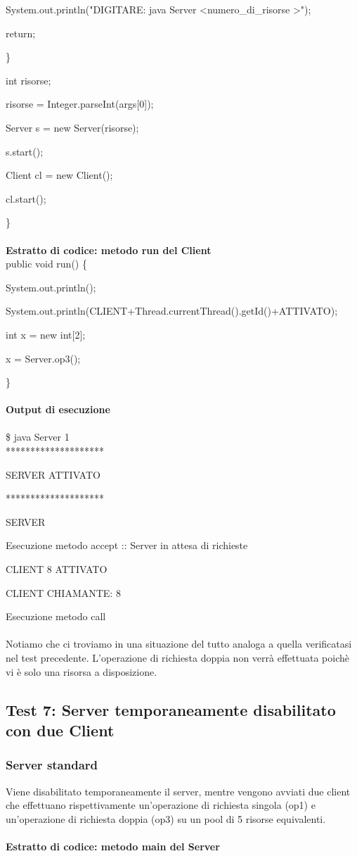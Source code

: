\documentclass[10pt, a4paper]{article}
\begin{document}
            System.out.println("DIGITARE: java Server \textless numero\_di\_risorse \textgreater");

            return;

        \}

        int risorse;

        risorse = Integer.parseInt(args[0]);

        Server s = new Server(risorse);

        s.start();

	Client cl = new Client();

	cl.start();

\}
\\\\
\textbf{Estratto di codice: metodo run del Client}
\\

public void run() \{

		System.out.println();

        	System.out.println(CLIENT+Thread.currentThread().getId()+ATTIVATO);

		int x = new int[2];

		x = Server.op3();

\}
\\\\
\textbf{Output di esecuzione}
\\\\
\$ java Server 1
\\

********************

SERVER ATTIVATO

********************

SERVER

Esecuzione metodo accept :: Server in attesa di richieste

CLIENT 8 ATTIVATO

CLIENT CHIAMANTE: 8

Esecuzione metodo call
\\\\
Notiamo che ci troviamo in una situazione del tutto analoga a quella verificatasi nel test precedente. L'operazione di richiesta doppia non verrà effettuata poichè vi è solo una risorsa a disposizione. 
\subsection{Test 7: Server temporaneamente disabilitato con due Client}
\subsubsection{Server standard}
Viene disabilitato temporaneamente il server, mentre vengono avviati due client che effettuano rispettivamente un'operazione di richiesta singola (op1) e un'operazione di richiesta doppia (op3) su un pool di 5 risorse equivalenti.
\\\\
\textbf{Estratto di codice: metodo main del Server}
\\
\end{document}
